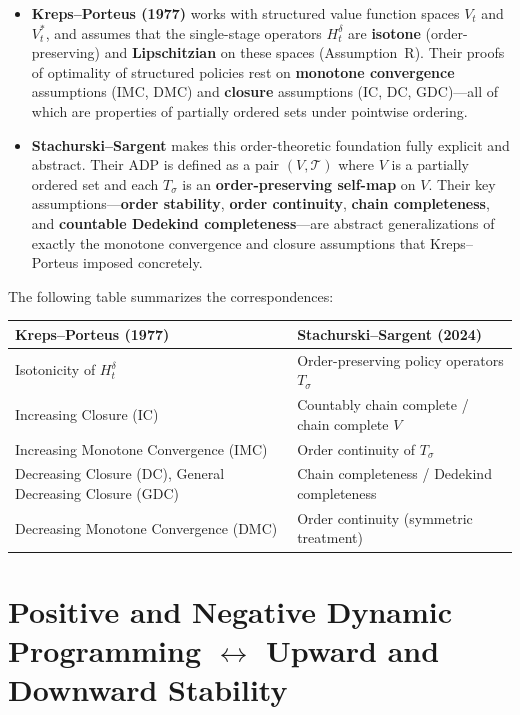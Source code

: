 \documentclass[12pt]{article}
\begin{document}
\begin{itemize}
\item \textbf{Kreps--Porteus (1977)} works with structured value function spaces $V_t$ and $V_t^*$, and assumes that the single-stage operators $H_t^\delta$ are \textbf{isotone} (order-preserving) and \textbf{Lipschitzian} on these spaces (Assumption~R). Their proofs of optimality of structured policies rest on \textbf{monotone convergence} assumptions (IMC, DMC) and \textbf{closure} assumptions (IC, DC, GDC)---all of which are properties of partially ordered sets under pointwise ordering.

\item \textbf{Stachurski--Sargent} makes this order-theoretic foundation fully explicit and abstract. Their ADP is defined as a pair $(V, \mathcal{T})$ where $V$ is a partially ordered set and each $T_\sigma$ is an \textbf{order-preserving self-map} on $V$. Their key assumptions---\textbf{order stability}, \textbf{order continuity}, \textbf{chain completeness}, and \textbf{countable Dedekind completeness}---are abstract generalizations of exactly the monotone convergence and closure assumptions that Kreps--Porteus imposed concretely.
\end{itemize}

\medskip
\noindent
The following table summarizes the correspondences:

\bigskip
\begin{center}
\begin{tabular}{@{}p{}p{}@{}}
\toprule
\textbf{Kreps--Porteus (1977)} & \textbf{Stachurski--Sargent (2024)} \\
\midrule
Isotonicity of $H_t^\delta$ & Order-preserving policy operators $T_\sigma$ \\[4pt]
Increasing Closure (IC) & Countably chain complete / chain complete $V$ \\[4pt]
Increasing Monotone Convergence (IMC) & Order continuity of $T_\sigma$ \\[4pt]
Decreasing Closure (DC), General Decreasing Closure (GDC) & Chain completeness / Dedekind completeness \\[4pt]
Decreasing Monotone Convergence (DMC) & Order continuity (symmetric treatment) \\
\bottomrule
\end{tabular}
\end{center}


\section{Positive and Negative Dynamic Programming $\leftrightarrow$ Upward and Downward Stability}
\end{document}
